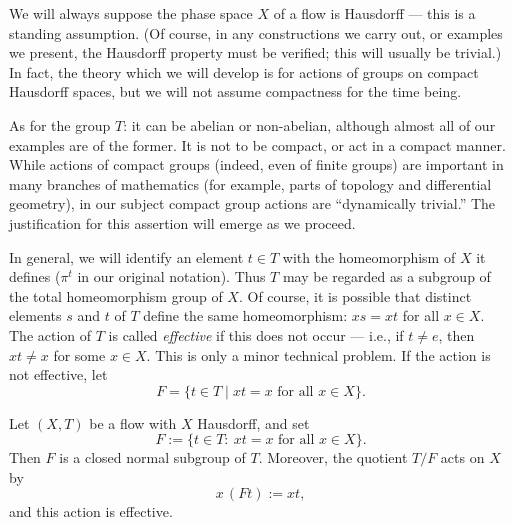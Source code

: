 We will always suppose the phase space $X$ of a flow is Hausdorff — this is a standing assumption. (Of course, in any constructions we carry out, or examples we present, the Hausdorff property must be verified; this will usually be trivial.) In fact, the theory which we will develop is for actions of groups on compact Hausdorff spaces, but we will not assume compactness for the time being.


As for the group $T$: it can be abelian or non-abelian, although almost all of our examples are of the former. It is not to be compact, or act in a compact manner. While actions of compact groups (indeed, even of finite groups) are important in many branches of mathematics (for example, parts of topology and differential geometry), in our subject compact group actions are ``dynamically trivial.'' The justification for this assertion will emerge as we proceed.


In general, we will identify an element $t \in T$ with the homeomorphism of $X$ it defines ($\pi^{t}$ in our original notation). Thus $T$ may be regarded as a subgroup of the total homeomorphism group of $X$. Of course, it is possible that distinct elements $s$ and $t$ of $T$ define the same homeomorphism: $xs = xt$ for all $x \in X$. The action of $T$ is called \emph{effective} if this does not occur — i.e., if $t \neq e$, then $xt \neq x$ for some $x \in X$. This is only a minor technical problem. If the action is not effective, let
\[
    F = \{t \in T \mid xt = x \text{ for all } x \in X\}.
\]


\begin{proposition}
    Let $(X,T)$ be a flow with $X$ Hausdorff, and set
    \[
        F:=\{t\in T:\ xt=x \text{ for all }x\in X\}.
    \]
    Then $F$ is a closed normal subgroup of $T$. Moreover, the quotient $T/F$ acts on $X$ by
    \[
        x\,(Ft):=xt,
    \]
    and this action is effective.
\end{proposition}

